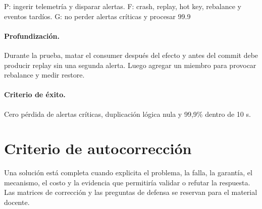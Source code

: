 \documentclass[variant=guiaresuelta,cover=institutional,mode=screen]{ua-engineering-v6-article}
\begin{document}
\begin{uaanswer}
P: ingerir telemetría y disparar alertas. F: crash, replay, hot key, rebalance y eventos tardíos. G: no perder alertas críticas y procesar 99.9%

\paragraph{Profundización.} Durante la prueba, matar el consumer después del efecto y antes del commit debe producir replay sin una segunda alerta. Luego agregar un miembro para provocar rebalance y medir restore.\paragraph{Criterio de éxito.} Cero pérdida de alertas críticas, duplicación lógica nula y 99,9\% dentro de 10 s.
\end{uaanswer}

\section{Criterio de autocorrección}

Una solución está completa cuando explicita el problema, la falla, la garantía, el mecanismo, el costo y la evidencia que permitiría validar o refutar la respuesta. Las matrices de corrección y las preguntas de defensa se reservan para el material docente.
\end{document}
